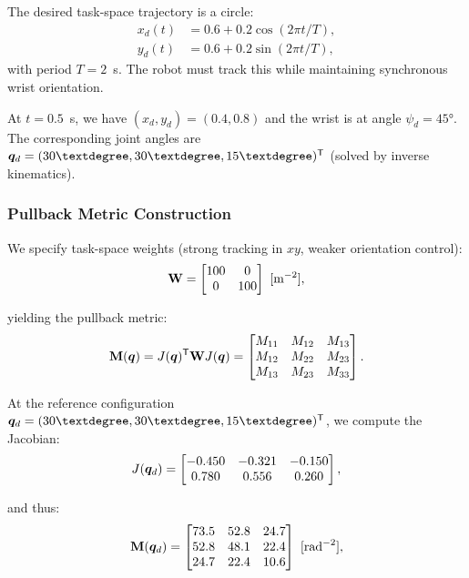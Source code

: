 The desired task-space trajectory is a circle:
\begin{align}
x_d(t) &= 0.6 + 0.2\cos(2\pi t / T), \\
y_d(t) &= 0.6 + 0.2\sin(2\pi t / T),
\end{align}
with period $T = 2$~s. The robot must track this while maintaining synchronous wrist
orientation.

At $t = 0.5$~s, we have $(x_d, y_d) = (0.4, 0.8)$ and the wrist is at angle $\psi_d = 45°$.
The corresponding joint angles are $\q_d = (30°, 30°, 15°)^\T$ (solved by inverse kinematics).

\subsubsection{Pullback Metric Construction}

We specify task-space weights (strong tracking in $xy$, weaker orientation control):
\begin{equation}
\mathbf{W} = \begin{bmatrix}
100 & 0 \\
0 & 100
\end{bmatrix}~[\text{m}^{-2}],
\label{eq:ch8:W-planar}
\end{equation}

yielding the pullback metric:
\begin{equation}
\mathbf{M}(\bm{q}) = J(\bm{q})^{\mathsf{T}} \mathbf{W} J(\bm{q}) = \begin{bmatrix}
M_{11} & M_{12} & M_{13} \\
M_{12} & M_{22} & M_{23} \\
M_{13} & M_{23} & M_{33}
\end{bmatrix}.
\label{eq:ch8:M-pullback}
\end{equation}

At the reference configuration $\q_d = (30°, 30°, 15°)^\T$, we compute the Jacobian:
\begin{equation}
J(\bm{q}_d) = \begin{bmatrix}
-0.450 & -0.321 & -0.150 \\
0.780 & 0.556 & 0.260
\end{bmatrix},
\end{equation}

and thus:
\begin{equation}
\mathbf{M}(\bm{q}_d) = \begin{bmatrix}
73.5 & 52.8 & 24.7 \\
52.8 & 48.1 & 22.4 \\
24.7 & 22.4 & 10.6
\end{bmatrix}~[\text{rad}^{-2}],
\label{eq:ch8:Mpullback-numeric}
\end{equation}

